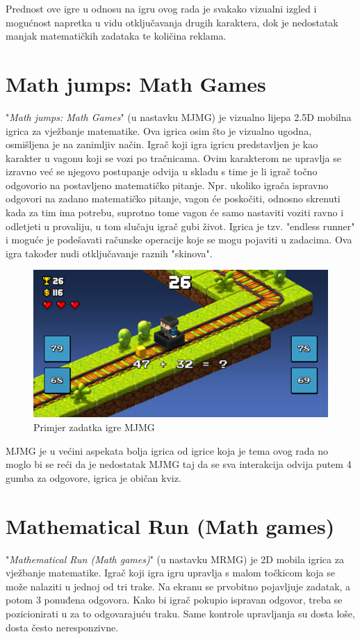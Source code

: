 \documentclass[times, utf8, zavrsni, numeric]{fer}
\begin{document}
	 Prednost ove igre u odnosu na igru ovog rada je svakako vizualni izgled i mogućnost napretka u vidu otključavanja drugih karaktera, dok je nedostatak manjak matematičkih zadataka te količina reklama. 
	
	
	\section{Math jumps: Math Games}
	"\textit{Math jumps: Math Games}"\cite{mathjump} (u nastavku MJMG) je vizualno lijepa 2.5D mobilna igrica za vježbanje matematike. Ova igrica osim što je vizualno ugodna, osmišljena je na zanimljiv način. Igrač koji igra igricu predstavljen je kao karakter
	u vagonu koji se vozi po tračnicama. Ovim karakterom ne upravlja se izravno već se njegovo postupanje odvija u skladu s time je li igrač točno odgovorio na postavljeno matematičko pitanje. Npr. ukoliko igrača ispravno odgovori na zadano matematičko
	pitanje, vagon će poskočiti, odnosno skrenuti kada za tim ima potrebu, suprotno tome vagon će samo nastaviti voziti ravno i odletjeti u provaliju, u tom slučaju igrač gubi život. Igrica je tzv. "endless runner" i moguće je podešavati računske operacije
	koje se mogu pojaviti u zadacima. Ova igra također nudi otključavanje raznih "skinova".
	
	\begin{figure}[H]
		\includegraphics[scale = 0.2]{"slike/igre/mathjumps.png"} 
		\centering
		\caption{Primjer zadatka igre MJMG}
		\label{fig:mjmg}
	\end{figure}
	
	MJMG je u većini aspekata bolja igrica od igrice koja je tema ovog rada no moglo bi se reći da je nedostatak MJMG taj da se sva interakcija odvija putem 4 gumba za odgovore, igrica je običan kviz.
	
	
	\section{Mathematical Run (Math games)}
	"\textit{Mathematical Run (Math games)}"\cite{mathrun} (u nastavku MRMG) je 2D mobila igrica za vježbanje matematike. Igrač koji igra igru upravlja s malom točkicom koja se može nalaziti u jednoj od tri trake. Na ekranu se prvobitno pojavljuje zadatak, a potom 3
	ponuđena odgovora. Kako bi igrač pokupio ispravan odgovor, treba se pozicionirati u za to odgovarajuću traku. Same kontrole upravljanja su dosta loše, dosta često neresponzivne.
	
\end{document}
